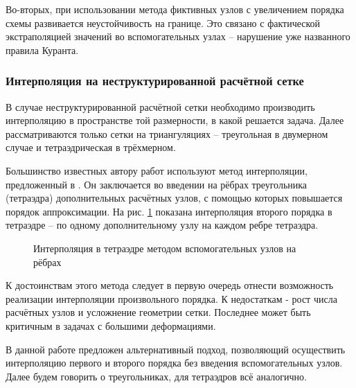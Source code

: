 Во-вторых, при использовании метода фиктивных узлов с увеличением порядка схемы развивается неустойчивость на границе. Это связано с фактической экстраполяцией значений во вспомогательных узлах -- нарушение уже названного правила Куранта.


\subsubsection{Интерполяция на неструктурированной расчётной сетке}
В случае неструктурированной расчётной сетки необходимо производить интерполяцию в пространстве той размерности, в какой решается задача. Далее рассматриваются только сетки на триангуляциях -- треугольная в двумерном случае и тетраэдрическая в трёхмерном.

Большинство известных автору работ используют метод интерполяции, предложенный в \cite{chelnokov_agapov}. Он заключается во введении на рёбрах треугольника (тетраэдра) дополнительных расчётных узлов, с помощью которых повышается порядок аппроксимации. На рис. \ref{pic:triangle-interp} показана интерполяция второго порядка в тетраэдре -- по одному дополнительному узлу на каждом ребре тетраэдра.

\begin{figure}[H]
	\caption{Интерполяция в тетраэдре методом вспомогательных узлов на рёбрах \cite{vasyukov}}
	\label{pic:triangle-interp}
\end{figure}

К достоинствам этого метода следует в первую очередь отнести возможность реализации интерполяции произвольного порядка. К недостаткам - рост числа расчётных узлов и усложнение геометрии сетки. Последнее может быть критичным в задачах с большими деформациями.

В данной работе предложен альтернативный подход, позволяющий осуществить интерполяцию первого и второго порядка без введения вспомогательных узлов. Далее будем говорить о треугольниках, для тетраэдров всё аналогично. 

